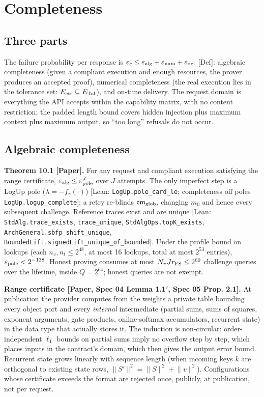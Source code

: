 \documentclass[10pt]{article}
\begin{document}
\section{Completeness}
\subsection{Three parts}
The failure probability per response is $\varepsilon_c\le\varepsilon_{\rm alg}+\varepsilon_{\rm num}+\varepsilon_{\rm del}$ [Def]: algebraic completeness (given a compliant execution and enough resources, the prover produces an accepted proof), numerical completeness (the real execution lies in the tolerance set: $E_{\rm ctr}\subseteq E_{\rm Tol}$), and on-time delivery. The request domain is everything the API accepts within the capability matrix, with no content restriction; the padded length bound covers hidden injection plus maximum context plus maximum output, so ``too long'' refusals do not occur.

\subsection{Algebraic completeness}
\textbf{Theorem 10.1 [Paper].} For any request and compliant execution satisfying the range certificate, $\varepsilon_{\rm alg}\le\varepsilon_{\rm pole}^J$ over $J$ attempts. The only imperfect step is a LogUp pole ($\lambda=-f_\gamma(\cdot)$) [Lean: \texttt{LogUp.\allowbreak{}pole\_\allowbreak{}card\_\allowbreak{}le}; completeness off poles \texttt{LogUp.\allowbreak{}logup\_\allowbreak{}complete}]; a retry re-blinds $\mathsf{cm}_{\rm glob}$, changing $m_0$ and hence every subsequent challenge. Reference traces exist and are unique [Lean: \texttt{StdAlg.\allowbreak{}trace\_\allowbreak{}exists}, \texttt{trace\_\allowbreak{}unique}, \texttt{StdAlgOps.\allowbreak{}topK\_\allowbreak{}exists}, \texttt{ArchGeneral.\allowbreak{}sbfp\_\allowbreak{}shift\_\allowbreak{}unique}, \texttt{BoundedLift.\allowbreak{}signedLift\_\allowbreak{}unique\_\allowbreak{}of\_\allowbreak{}bounded}]. Under the profile bound on lookups (each $n_v,n_t\le2^{48}$, at most 16 lookups, total at most $2^{53}$ entries), $\varepsilon_{\rm pole}<2^{-138}$. Honest proving consumes at most $N_\pi J r_{\rm FS}\le2^{60}$ challenge queries over the lifetime, inside $Q=2^{64}$; honest queries are not exempt.

\textbf{Range certificate [Paper, Spec 04 Lemma 1.1$'$, Spec 05 Prop. 2.1].} At publication the provider computes from the weights a private table bounding every object port and every \emph{internal} intermediate (partial sums, sums of squares, exponent arguments, gate products, online-softmax accumulators, recurrent state) in the data type that actually stores it. The induction is non-circular: order-independent $\ell_1$ bounds on partial sums imply no overflow step by step, which places inputs in the contract's domain, which then gives the output error bound. Recurrent state grows linearly with sequence length (when incoming keys $k$ are orthogonal to existing state rows, $\lVert S'\rVert^2=\lVert S\rVert^2+\lVert v\rVert^2$). Configurations whose certificate exceeds the format are rejected once, publicly, at publication, not per request.
\end{document}
